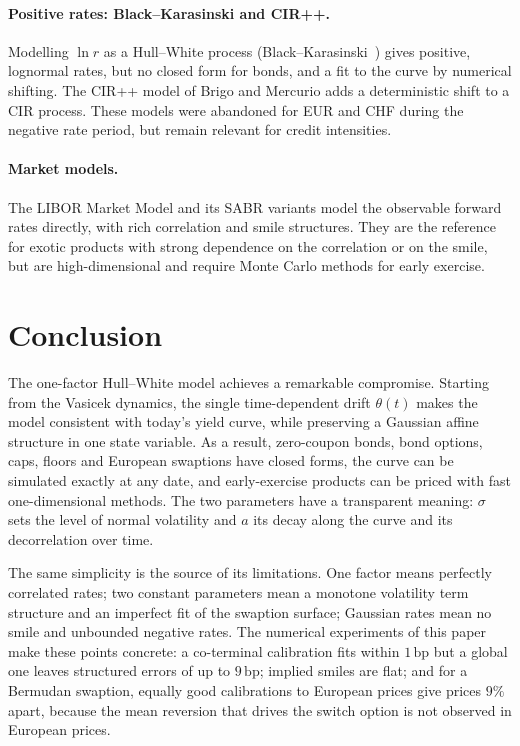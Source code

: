 \documentclass[11pt,a4paper]{article}
\theoremstyle{plain}
\theoremstyle{definition}
\newcommand{\bp}{\,\mathrm{bp}}
\begin{document}
\paragraph{Positive rates: Black--Karasinski and CIR++.} Modelling $\ln r$ as a Hull--White process (Black--Karasinski~\cite{bk}) gives positive, lognormal rates, but no closed form for bonds, and a fit to the curve by numerical shifting. The CIR++ model of Brigo and Mercurio adds a deterministic shift to a CIR process. These models were abandoned for EUR and CHF during the negative rate period, but remain relevant for credit intensities.

\paragraph{Market models.} The LIBOR Market Model and its SABR variants model the observable forward rates directly, with rich correlation and smile structures. They are the reference for exotic products with strong dependence on the correlation or on the smile, but are high-dimensional and require Monte Carlo methods for early exercise.

\clearpage
\section{Conclusion}
\label{sec:conclusion}

The one-factor Hull--White model achieves a remarkable compromise. Starting from the Vasicek dynamics, the single time-dependent drift $\theta(t)$ makes the model consistent with today's yield curve, while preserving a Gaussian affine structure in one state variable. As a result, zero-coupon bonds, bond options, caps, floors and European swaptions have closed forms, the curve can be simulated exactly at any date, and early-exercise products can be priced with fast one-dimensional methods. The two parameters have a transparent meaning: $\sigma$ sets the level of normal volatility and $a$ its decay along the curve and its decorrelation over time.

The same simplicity is the source of its limitations. One factor means perfectly correlated rates; two constant parameters mean a monotone volatility term structure and an imperfect fit of the swaption surface; Gaussian rates mean no smile and unbounded negative rates. The numerical experiments of this paper make these points concrete: a co-terminal calibration fits within $1\bp$ but a global one leaves structured errors of up to $9\bp$; implied smiles are flat; and for a Bermudan swaption, equally good calibrations to European prices give prices $9\%$ apart, because the mean reversion that drives the switch option is not observed in European prices.
\end{document}
